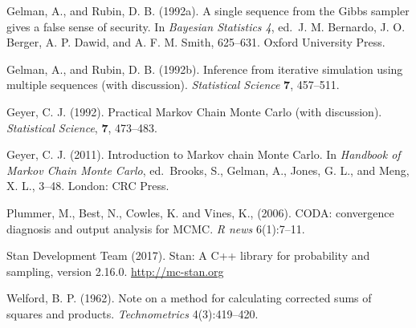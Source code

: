\documentclass[11pt]{article}
\begin{document}
\bibitem Gelman, A., and Rubin, D. B. (1992a).  A single sequence from the Gibbs sampler gives a false sense of security.
In {\em Bayesian Statistics 4}, ed.\ J. M. Bernardo, J. O. Berger, A. P. Dawid, and A. F. M. Smith, 625--631.  Oxford University Press.

\bibitem Gelman, A., and Rubin, D. B. (1992b).   Inference from iterative simulation using multiple sequences (with discussion).  {\em Statistical Science} {\bf 7}, 457--511.

\bibitem Geyer, C. J. (1992). Practical {Markov} Chain {Monte} {Carlo} (with discussion). {\em Statistical Science}, {\bf 7}, 473--483.

\bibitem Geyer, C. J. (2011). Introduction to Markov chain Monte Carlo. In {\em Handbook of Markov Chain Monte Carlo}, ed.\ Brooks, S., Gelman, A., Jones, G. L., and Meng, X. L., 3--48.  London:  CRC Press.

\bibitem Plummer, M., Best, N., Cowles, K. and Vines, K., (2006). CODA: convergence diagnosis and output analysis for MCMC. {\em R news} 6(1):7--11.

\bibitem Stan Development Team (2017). Stan: A C++ library for probability and sampling, version 2.16.0.   \url{http://mc-stan.org}

\bibitem Welford, B. P. (1962). Note on a method for calculating corrected sums of squares and products. {\em Technometrics} 4(3):419--420.
\end{document}
